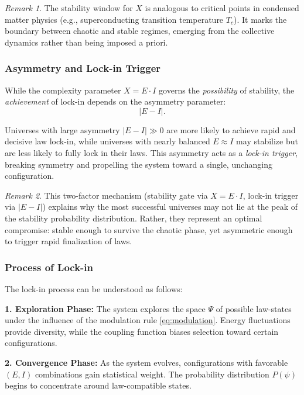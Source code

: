\documentclass[12pt,a4paper]{article}
\theoremstyle{definition}
\theoremstyle{remark}
\newtheorem{remark}{Remark}[section]
\begin{document}
\begin{remark}
The stability window for $X$ is analogous to critical points in condensed matter physics (e.g., superconducting transition temperature $T_c$). It marks the boundary between chaotic and stable regimes, emerging from the collective dynamics rather than being imposed a priori.
\end{remark}

\subsubsection{Asymmetry and Lock-in Trigger}

While the complexity parameter $X = E \cdot I$ governs the \emph{possibility} of stability, the \emph{achievement} of lock-in depends on the asymmetry parameter:
\begin{equation}\label{eq:asymmetry}
|E - I|.
\end{equation}

Universes with large asymmetry $|E - I| \gg 0$ are more likely to achieve rapid and decisive law lock-in, while universes with nearly balanced $E \approx I$ may stabilize but are less likely to fully lock in their laws. This asymmetry acts as a \emph{lock-in trigger}, breaking symmetry and propelling the system toward a single, unchanging configuration.

\begin{remark}
This two-factor mechanism (stability gate via $X = E \cdot I$, lock-in trigger via $|E - I|$) explains why the most successful universes may not lie at the peak of the stability probability distribution. Rather, they represent an optimal compromise: stable enough to survive the chaotic phase, yet asymmetric enough to trigger rapid finalization of laws.
\end{remark}

\subsubsection{Process of Lock-in}

The lock-in process can be understood as follows:

\textbf{1. Exploration Phase:} The system explores the space $\Psi$ of possible law-states under the influence of the modulation rule \eqref{eq:modulation}. Energy fluctuations provide diversity, while the coupling function biases selection toward certain configurations.

\textbf{2. Convergence Phase:} As the system evolves, configurations with favorable $(E, I)$ combinations gain statistical weight. The probability distribution $P(\psi)$ begins to concentrate around law-compatible states.
\end{document}

